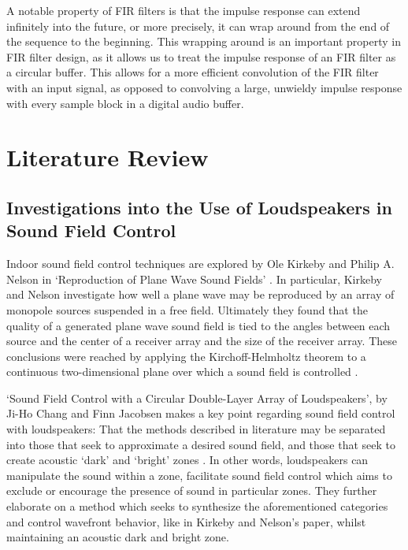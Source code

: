 \documentclass{report}
\begin{document}
        A notable property of FIR filters is that the impulse response can extend infinitely into the future, or more precisely, it can wrap around from the end of the sequence to the beginning.
        This wrapping around is an important property in FIR filter design, as it allows us to treat the impulse response of an FIR filter as a circular buffer.
        This allows for a more efficient convolution of the FIR filter with an input signal, as opposed to convolving a large, unwieldy impulse response with every sample block in a digital audio buffer.

        
\chapter{Literature Review}
    \section{Investigations into the Use of Loudspeakers in Sound Field Control}

        Indoor sound field control techniques are explored by Ole Kirkeby and Philip A. Nelson in `Reproduction of Plane Wave Sound Fields' \cite{kirkeby1993reproduction}.
        In particular, Kirkeby and Nelson investigate how well a plane wave may be reproduced by an array of monopole sources suspended in a free field.
        Ultimately they found that the quality of a generated plane wave sound field is tied to the angles between each source and the center of a receiver array and the size of the receiver array.
        These conclusions were reached by applying the Kirchoff-Helmholtz theorem to a continuous two-dimensional plane over which a sound field is controlled \cite{kirkeby1993reproduction}.

        `Sound Field Control with a Circular Double-Layer Array of Loudspeakers', by Ji-Ho Chang and Finn Jacobsen makes a key point regarding sound field control with loudspeakers: That the methods described in literature may be separated into those that seek to approximate a desired sound field, and those that seek to create acoustic `dark' and `bright' zones \cite{chang2012sound}.
        In other words, loudspeakers can manipulate the sound within a zone, facilitate sound field control which aims to exclude or encourage the presence of sound in particular zones.
        They further elaborate on a method which seeks to synthesize the aforementioned categories and control wavefront behavior, like in Kirkeby and Nelson's paper, whilst maintaining an acoustic dark and bright zone.
\end{document}
